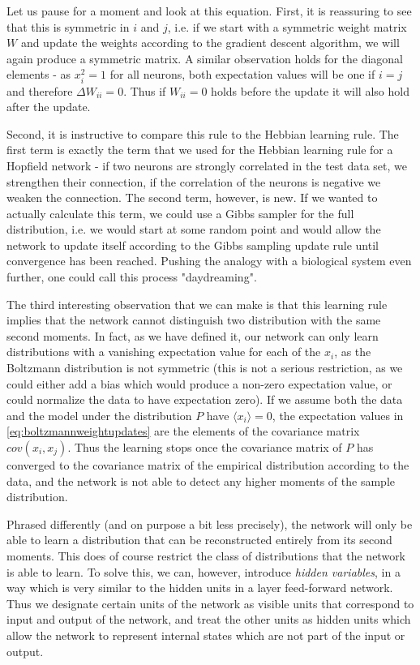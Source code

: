 \documentclass[a4paper, draft]{article}
\theoremstyle{own}
\theoremstyle{remark}
\begin{document}
Let us pause for a moment and look at this equation. First, it is reassuring to see that this is symmetric in $i$ and $j$, i.e. if we start with a symmetric weight matrix $W$ and update the weights according to the gradient descent algorithm, we will again produce a symmetric matrix. A similar observation holds for the diagonal elements - as $x_i^2 = 1$ for all neurons, both expectation values will be one if $i = j$ and therefore $\Delta W_{ii}= 0$. Thus if $W_{ii}  = 0$ holds before the update it will also hold after the update.

Second, it is instructive to compare this rule to the Hebbian learning rule. The first term is exactly the term that we used for the Hebbian learning rule for a Hopfield network - if two neurons are strongly correlated in the test data set, we strengthen their connection, if the correlation of the neurons is negative we weaken the connection. The second term, however, is new. If we wanted to actually calculate this term, we could use a Gibbs sampler for the full distribution, i.e. we would start at some random point and would allow the network to update itself according to the Gibbs sampling update rule until convergence has been reached. Pushing the analogy with a biological system even further, one could call this process "daydreaming". 

The third interesting observation that we can make is that this learning rule implies that the network cannot distinguish two distribution with the same second moments. In fact, as we have defined it, our network can only learn distributions with a vanishing expectation value for each of the $x_i$, as the Boltzmann distribution is not symmetric (this is not a serious restriction, as we could either add a bias which would produce a non-zero expectation value, or could normalize the data to have expectation zero). If we assume both the data and the model under the distribution $P$ have $\langle x_i \rangle = 0$, the expectation values in \eqref{eq:boltzmannweightupdates} are the elements of the covariance matrix $cov(x_i, x_j)$. Thus the learning stops once the covariance matrix of $P$ has converged to the covariance matrix of the empirical distribution according to the data, and the network is not able to detect any higher moments of the sample distribution. 

Phrased differently (and on purpose a bit less precisely), the network will only be able to learn a distribution that can be reconstructed entirely from its second moments. This does of course restrict the class of distributions that the network is able to learn. To solve this, we can, however, introduce {\em hidden variables}, in a way which is very similar to the hidden units in a layer feed-forward network. Thus we designate certain units of the network as visible units that correspond to input and output of the network, and treat the other units as hidden units which allow the network to represent internal states which are not part of the input or output.
\end{document}
